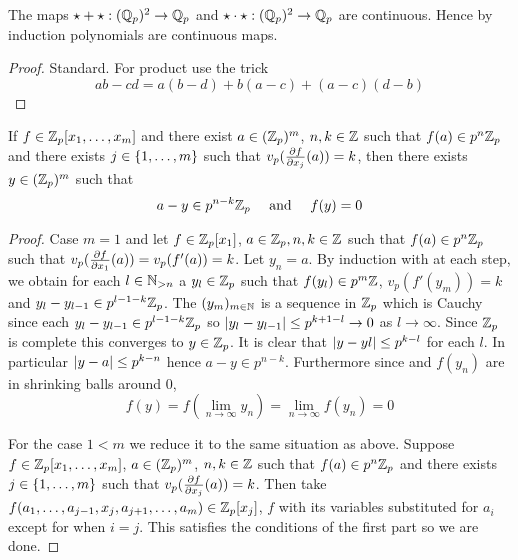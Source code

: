 \begin{prop}
    The maps $\star + \star : (\mathbb{Q}_p)^2 \to \mathbb{Q}_p$ and 
    $\star \cdot \star : (\mathbb{Q}_p)^2 \to \mathbb{Q}_p$ are continuous.
    Hence by induction polynomials are continuous maps.
\end{prop}
\begin{proof}
    Standard.
    For product use the trick
    \[ab - cd = a(b - d) + b(a - c) +(a - c)(d - b)\]
\end{proof}

\begin{prop}[?]
    If $f \in \mathbb{Z}_p[x_1,\dots, x_m]$ and there exist 
    $a \in (\mathbb{Z}_p)^m$,
    $n, k \in \mathbb{Z}$ such that $f(a) \in p^n \mathbb{Z}_p$
    and there exists $j \in \left\{1, \dots, m\right\}$ such that 
    $v_p (\frac{\partial f}{\partial x_j}(a)) = k$,
    then there exists $y \in (\mathbb{Z}_p)^m$ such that
    \[a - y \in p^{n-k} \mathbb{Z}_p \quad \text{ and } \quad f(y) = 0\]
\end{prop}
\begin{proof}
    Case $m = 1$ and let $f \in \mathbb{Z}_p[x_1]$, 
    $a \in \mathbb{Z}_p, n, k \in \mathbb{Z}$ such that $f(a) \in p^n \mathbb{Z}_p$
    such that 
    $v_p (\frac{\partial f}{\partial x_1}(a)) = v_p(f'(a))= k$.
    Let $y_n = a$.
    By induction with  
    at each step, 
    we obtain for each $l \in \mathbb{N}_{> n}$ a 
    $y_l \in \mathbb{Z}_p$ such that $f(y_l) \in p^{m} \mathbb{Z}$,
    $v_p(f'(y_m)) = k$ and 
    $y_{l} - y_{l-1} \in p^{l-1-k} \mathbb{Z}_p$.
    The $(y_m)_{m \in \mathbb{N}}$ is a sequence in $\mathbb{Z}_p$
    which is Cauchy since each $y_{l} - y_{l-1} \in p^{l-1-k} \mathbb{Z}_p$
    so $\left\vert y_{l} - y_{l-1} \right\vert \le p^{k + 1 - l} \to 0$ 
    as $l \to \infty$.
    Since $\mathbb{Z}_p$ is complete this converges to $y \in \mathbb{Z}_p$.
    It is clear that $\left\vert y - y{l} \right\vert \le p^{k-l}$
    for each $l$. 
    In particular $\left\vert y - a \right\vert \le p^{k-n}$
    hence $a - y \in p^{n-k}$.
    Furthermore since 
    and $f(y_n)$ are in shrinking balls around $0$,
    \[f(y) = f(\lim_{n \to \infty} y_n) = 
    \lim_{n \to \infty} f(y_n) = 0\]
    
    For the case $1 < m$ 
    we reduce it to the same situation as above.
    Suppose $f \in \mathbb{Z}_p[x_1,\dots, x_m]$,
    $a \in (\mathbb{Z}_p)^m$,
    $n, k \in \mathbb{Z}$ such that $f(a) \in p^n \mathbb{Z}_p$
    and there exists $j \in \left\{1, \dots, m\right\}$ such that 
    $v_p (\frac{\partial f}{\partial x_j}(a)) = k$.
    Then take 
    $f(a_1,\dots, a_{j-1}, x_j, a_{j+1},\dots, a_m) \in \mathbb{Z}_p[x_j]$,
    $f$ with its variables substituted for $a_i$ except for when $i = j$.
    This satisfies the conditions of the first part
    so we are done.
\end{proof}

